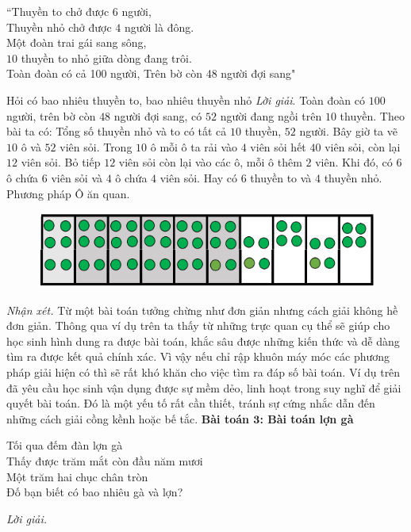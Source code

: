 \begin{multicols}{2}
	\begin{center}
		``Thuyền to chở được $6$ người,\\
	Thuyền nhỏ chở được $4$ người là đông.\\
	Một đoàn trai gái sang sông,\\
	$10$ thuyền to nhỏ giữa dòng đang trôi.\\
	Toàn đoàn có cả 100 người, Trên bờ còn 48 người đợi sang"
	\end{center}
	Hỏi có bao nhiêu thuyền to, bao nhiêu thuyền nhỏ
	\vskip 0.1cm
	\textit{Lời giải}.
	Toàn đoàn có $100$ người, trên bờ còn $48$ người đợi sang, có $52$ người đang ngồi trên $10$ thuyền.
	\vskip 0.1cm
	Theo bài ta có: Tổng số thuyền nhỏ và to có tất cả $10$ thuyền, $52$ người.
	\vskip 0.1cm
	Bây giờ ta vẽ $10$ ô và $52$ viên sỏi. Trong $10$ ô mỗi ô ta rải vào $4$ viên sỏi hết $40$ viên sỏi, còn lại $12$ viên sỏi. Bỏ tiếp $12$ viên sỏi còn lại vào các ô, mỗi ô thêm $2$ viên. Khi đó, có $6$ ô chứa $6$ viên sỏi và $4$ ô chứa $4$ viên sỏi. Hay có $6$ thuyền to và $4$ thuyền nhỏ.
	\vskip 0.1cm
	Phương pháp Ô ăn quan.
	\begin{figure}[H]
		\vspace*{-5pt}
		\centering
		\captionsetup{labelformat= empty, justification=centering}
		\includegraphics[width= 1\linewidth]{2}
		\vspace*{-15pt}
	\end{figure}
	\textit{Nhận xét.}
	Từ một bài toán tưởng chừng như đơn giản nhưng cách giải không hề đơn giản. Thông qua ví dụ trên ta thấy từ những trực quan cụ thể sẽ giúp cho học sinh hình dung ra được bài toán, khắc sâu được những kiến thức và dễ dàng tìm ra được kết quả chính xác.
	\vskip 0.1cm
	Vì vậy nếu chỉ rập khuôn máy móc các phương pháp giải hiện có thì sẽ rất khó khăn cho việc tìm ra đáp số bài toán.
	\vskip 0.1cm
	Ví dụ trên đã yêu cầu học sinh vận dụng được sự mềm dẻo, linh hoạt trong suy nghĩ để giải quyết bài toán. Đó là một yếu tố rất cần thiết, tránh sự cứng nhắc dẫn đến những cách giải cồng kềnh hoặc bế tắc.
	\vskip 0.1cm
	\textbf{Bài toán $\pmb3$: Bài toán lợn gà}
	\begin{center}
		Tối qua đếm đàn lợn gà\\
	Thấy được trăm mắt còn đầu năm mươi\\
	Một trăm hai chục chân tròn\\
	Đố bạn biết có bao nhiêu gà và lợn?
	\end{center}
	\textit{Lời giải.}
	

\end{multicols}
